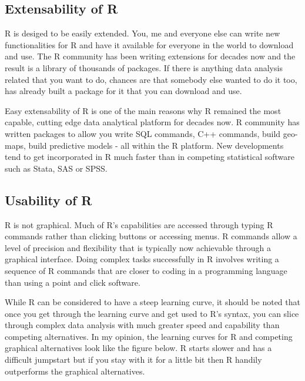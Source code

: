 \documentclass[]{krantz}
\theoremstyle{definition}
\theoremstyle{definition}
\theoremstyle{definition}
\theoremstyle{remark}
\begin{document}
\subsection{Extensability of R}\label{extensability-of-r}

R is desiged to be easily extended. You, me and everyone else can write
new functionalities for R and have it available for everyone in the
world to download and use. The R community has been writing extensions
for decades now and the result is a library of thousands of packages. If
there is anything data analysis related that you want to do, chances are
that somebody else wanted to do it too, has already built a package for
it that you can download and use.

Easy extensability of R is one of the main reasons why R remained the
most capable, cutting edge data analytical platform for decades now. R
community has written packages to allow you write SQL commands, C++
commands, build geo-maps, build predictive models - all within the R
platform. New developments tend to get incorporated in R much faster
than in competing statistical software such as Stata, SAS or SPSS.

\subsection{Usability of R}\label{usability-of-r}

R is not graphical. Much of R's capabilities are accessed through typing
R commands rather than clicking buttons or accessing menus. R commands
allow a level of precision and flexibility that is typically now
achievable through a graphical interface. Doing complex tasks
successfully in R involves writing a sequence of R commands that are
closer to coding in a programming language than using a point and click
software.

While R can be considered to have a steep learning curve, it should be
noted that once you get through the learning curve and get used to R's
syntax, you can slice through complex data analysis with much greater
speed and capability than competing alternatives. In my opinion, the
learning curves for R and competing graphical alternatives look like the
figure below. R starts slower and has a difficult jumpstart but if you
stay with it for a little bit then R handily outperforms the graphical
alternatives.
\end{document}
